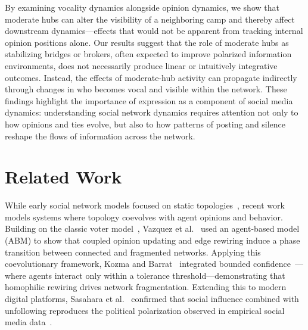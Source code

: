 \documentclass{svproc}
\begin{document}
\par

By examining vocality dynamics alongside opinion dynamics, we show that
moderate hubs can alter the visibility of a neighboring camp and thereby
affect downstream dynamics---effects that would not be apparent from
tracking internal opinion positions alone. Our results suggest that the
role of moderate hubs as stabilizing bridges or brokers, often expected
to improve polarized information environments, does not necessarily
produce linear or intuitively integrative outcomes. Instead, the effects
of moderate-hub activity can propagate indirectly through changes in
who becomes vocal and visible within the network. 
These findings highlight the importance of expression 
as a component of social media dynamics: understanding 
social network dynamics requires attention not only 
to how opinions and ties evolve, but also to how 
patterns of posting and silence reshape the flows 
of information across the network.


\section{Related Work}\label{sec:related}
While early social network models focused on static
topologies~\cite{watts1998}, recent work models systems where topology
coevolves with agent opinions and behavior. Building on the classic
voter model~\cite{clifford1973}, Vazquez et al.~\cite{vazquez2008}
used an agent-based model (ABM) to show that coupled opinion updating
and edge rewiring induce a phase transition between connected and
fragmented networks. Applying this coevolutionary framework, Kozma and
Barrat~\cite{kozma2008} integrated bounded
confidence~\cite{deffuant2000,hegselmann2002}—where agents interact
only within a tolerance threshold—demonstrating that homophilic
rewiring drives network fragmentation. Extending this to modern
digital platforms, Sasahara et al.~\cite{sasahara2020} confirmed that
social influence combined with unfollowing reproduces the political
polarization observed in empirical social media
data~\cite{conover2011}.
\par
\end{document}
